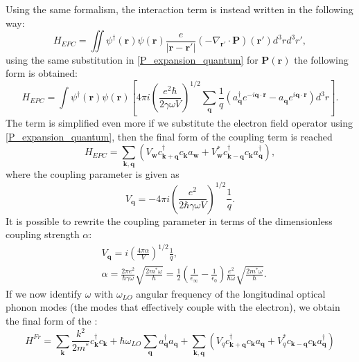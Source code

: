 \documentclass[12pt, a4paper]{report}
\numberwithin{equation}{section}
\begin{document}
Using the same formalism, the interaction term is instead written in the following way:
\begin{equation}
    H_{EPC}=\iint\psi^\dagger(\mathbf{r})\psi(\mathbf{r})\frac{e}{|\mathbf{r}-\mathbf{r}'|}(-\nabla_{\mathbf{r}'}\cdot\mathbf{P})(\mathbf{r}')d^3rd^3r',
\end{equation}
using the same substitution in \ref{P_expansion_quantum} for $\mathbf{P}(\mathbf{r})$ the following form is obtained:
\begin{equation}
    H_{EPC}=\int \psi^\dagger(\mathbf{r})\psi(\mathbf{r})\left[4\pi i \left(\frac{e^2\hbar}{2\gamma\omega V}\right)^{1/2}\sum_\mathbf{q}\frac{1}{q}(a^\dagger_\mathbf{q}e^{-i\mathbf{q}\cdot\mathbf{r}}-a_\mathbf{q}e^{i\mathbf{q}\cdot\mathbf{r}})d^3r\right].
\end{equation}
The term is simplified even more if we substitute the electron field operator using \ref{P_expansion_quantum}, then the final form of 
the coupling term is reached
\begin{equation}
    H_{EPC}=\sum_{\mathbf{k},\mathbf{q}}(V_\mathbf{w}c^\dagger_\mathbf{k+q}c_\mathbf{k}a_\mathbf{w}+V^*_\mathbf{w}c^\dagger_\mathbf{k-q}c_\mathbf{k}a^\dagger_\mathbf{q}),
\end{equation}
where the coupling parameter is given as 
\begin{equation}
    V_\mathbf{q}=-4\pi i\left(\frac{e^2}{2\hbar\gamma\omega V}\right)^{1/2}\frac{1}{q}.
\end{equation}
It is possible to rewrite the coupling parameter in terms of the dimensionless coupling strength $\alpha$:
\begin{equation}
\begin{split}
    &V_\mathbf{q}=i\left(\frac{4\pi\alpha}{V}\right)^{1/2}\frac{1}{q},\\
    &\alpha=\frac{2\pi e^2}{\hbar\gamma\omega}\sqrt{\frac{2m^*\omega}{\hbar}}=\frac{1}{2}\left(\frac{1}{\epsilon_\infty}-\frac{1}{\epsilon_0}\right)\frac{e^2}{\hbar\omega}\sqrt{\frac{2m^*\omega}{\hbar}}.
\end{split}
\end{equation}
If we now identify $\omega$ with $\omega_{LO}$ angular frequency of the longitudinal optical phonon modes (the modes that effectively 
couple with the electron), we obtain the final form of the :
\begin{equation}
    H^{Fr}=\sum_\mathbf{k}\frac{k^2}{2m^*}c^\dagger_{\mathbf{k}}c_\mathbf{k}+\hbar\omega_{LO}\sum_\mathbf{q}a^\dagger_\mathbf{q}a_\mathbf{q}+\sum_{\mathbf{k},\mathbf{q}}(V_qc^\dagger_{\mathbf{k}+\mathbf{q}}c_\mathbf{k}a_\mathbf{q}+V_q^*c_{\mathbf{k}-\mathbf{q}}c_\mathbf{k}a^\dagger_\mathbf{q})
    \label{Froehlich_Hamiltonian_second}
\end{equation}
\end{document}
